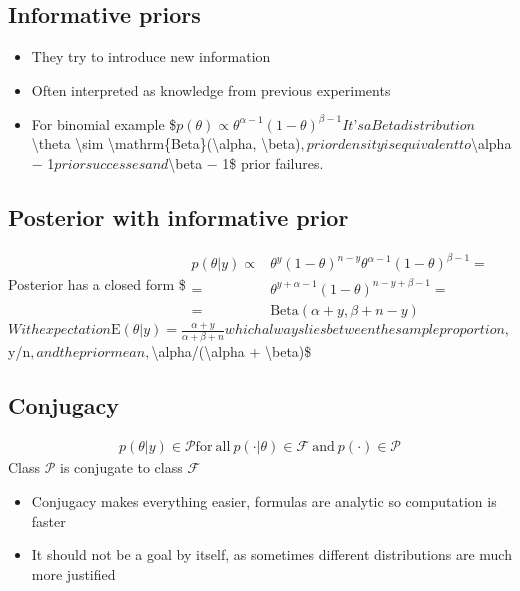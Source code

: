 \documentclass[letterpaper,10pt,english]{jupyterBook}
\begin{document}
\subsection{Informative priors}
\label{\detokenize{Lecture 2:informative-priors}}\begin{itemize}
\item {} 
\sphinxAtStartPar
They try to introduce new information

\item {} 
\sphinxAtStartPar
Often interpreted as knowledge from previous experiments

\item {} 
\sphinxAtStartPar
For binomial example
\$\( p(\theta)\propto \theta^{\alpha-1}(1-\theta)^{\beta-1}\)\(
It’s a Beta distribution \)\textbackslash{}theta \textbackslash{}sim \textbackslash{}mathrm\{Beta\}(\textbackslash{}alpha, \textbackslash{}beta)\(, prior density is equivalent to \)\textbackslash{}alpha − 1\( prior successes and \)\textbackslash{}beta − 1\$ prior failures.

\end{itemize}


\subsection{Posterior with informative prior}
\label{\detokenize{Lecture 2:posterior-with-informative-prior}}
\sphinxAtStartPar
Posterior has a closed form
\$\(
\begin{aligned}
p(\theta|y)\propto{}& \theta^{y}(1-\theta)^{n-y}\theta^{\alpha-1}(1-\theta)^{\beta-1}=\\
={}&\theta^{y+\alpha-1}(1-\theta)^{n-y+\beta-1}=\\
={}&\mathrm{Beta}(\alpha+y,\beta+n-y)
\end{aligned}
\)\(
With expectation
\)\(
\mathrm{E}(\theta|y)=\frac{\alpha+y}{\alpha+\beta+n}
\)\(
which always lies between the sample proportion, \)y/n\(, and the prior mean, \)\textbackslash{}alpha/(\textbackslash{}alpha + \textbackslash{}beta)\$


\subsection{Conjugacy}
\label{\detokenize{Lecture 2:conjugacy}}\begin{equation*}
\begin{split} p(\theta|y)\in\mathcal{P}\mathrm{for\ all}\ p(\cdot|\theta)\in\mathcal{F}\ \mathrm{and}\ p(\cdot)\in\mathcal{P}
\end{split}
\end{equation*}
\sphinxAtStartPar
Class \(\mathcal{P}\) is conjugate to class \(\mathcal{F}\)
\begin{itemize}
\item {} 
\sphinxAtStartPar
Conjugacy makes everything easier, formulas are analytic so computation is faster

\item {} 
\sphinxAtStartPar
It should not be a goal by itself, as sometimes different distributions are much more justified

\end{itemize}
\end{document}
